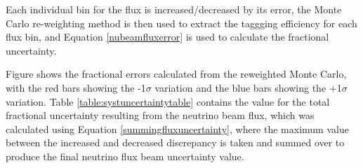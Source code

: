 \documentclass{article}
\begin{document}
Each individual bin for the flux is increased/decreased by its error, the Monte Carlo re-weighting method is then used to extract the taggging efficiency for each flux bin, and Equation \eqref{nubeamfluxerror} is used to calculate the fractional uncertainty.


Figure  shows the fractional errors calculated from the reweighted Monte Carlo, with the red bars showing the -1$\sigma$ variation and the blue bars showing the +1$\sigma$ variation. Table \ref{table:systuncertaintytable} contains the value for the total fractional uncertainty resulting from the neutrino beam flux, which was calculated using Equation \eqref{summingfluxuncertainty}, where the maximum value between the increased and decreased discrepancy is taken and summed over to produce the final neutrino flux beam uncertainty value.


\end{document}

